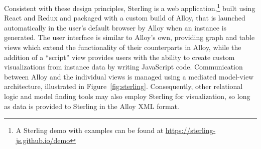 \documentclass[runningheads]{llncs}
\begin{document}
Consistent with these design principles, Sterling is a web application,\footnote{A Sterling demo with examples can be found at \href{https://sterling-js.github.io/demo}{https://sterling-js.github.io/demo}} built using React and Redux and packaged with a custom build of Alloy, that is launched automatically in the user's default browser by Alloy when an instance is generated. 
The user interface is similar to Alloy's own, providing graph and table views which extend the functionality of their counterparts in Alloy, while the addition of a ``script'' view provides users with the ability to create custom visualizations from instance data by writing JavaScript code.
Communication between Alloy and the individual views is managed using a mediated model-view architecture, illustrated in Figure~\ref{fig:sterling}. Consequently, other relational logic and model finding tools may also employ Sterling for visualization, so long as data is provided to Sterling in the Alloy XML format.

\end{document}

